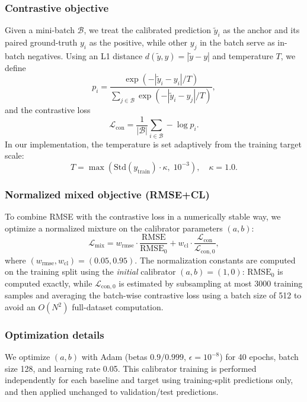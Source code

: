 \documentclass[11pt,conference,onecolumn]{IEEEtran}
\begin{document}
\subsubsection{Contrastive objective}
Given a mini-batch $\mathcal{B}$, we treat the calibrated prediction $\tilde{y}_i$ as the anchor and its paired ground-truth $y_i$ as the positive, while other $y_j$ in the batch serve as in-batch negatives. Using an L1 distance $d(\tilde{y},y)=|\tilde{y}-y|$ and temperature $T$, we define
\begin{equation}
p_i=
\frac{\exp\!\left(-|\tilde{y}_i-y_i|/T\right)}
{\sum_{j\in\mathcal{B}}\exp\!\left(-|\tilde{y}_i-y_j|/T\right)},
\end{equation}
and the contrastive loss
\begin{equation}
\mathcal{L}_{\mathrm{con}}=\frac{1}{|\mathcal{B}|}\sum_{i\in\mathcal{B}}-\log p_i.
\end{equation}
In our implementation, the temperature is set adaptively from the training target scale:
\begin{equation}
T=\max\!\left(\mathrm{Std}(y_{\mathrm{train}})\cdot \kappa,\;10^{-3}\right),\quad \kappa=1.0.
\end{equation}

\subsubsection{Normalized mixed objective (RMSE+CL)}
To combine RMSE with the contrastive loss in a numerically stable way, we optimize a normalized mixture on the calibrator parameters $(a,b)$:
\begin{equation}
\mathcal{L}_{\mathrm{mix}}
= w_{\mathrm{rmse}} \cdot \frac{\mathrm{RMSE}}{\mathrm{RMSE}_0}
+ w_{\mathrm{cl}}\cdot \frac{\mathcal{L}_{\mathrm{con}}}{\mathcal{L}_{\mathrm{con},0}},
\end{equation}
where $(w_{\mathrm{rmse}},w_{\mathrm{cl}})=(0.05,0.95)$. The normalization constants are computed on the training split using the \emph{initial} calibrator $(a,b)=(1,0)$: $\mathrm{RMSE}_0$ is computed exactly, while $\mathcal{L}_{\mathrm{con},0}$ is estimated by subsampling at most 3000 training samples and averaging the batch-wise contrastive loss using a batch size of 512 to avoid an $O(N^2)$ full-dataset computation.

\subsubsection{Optimization details}
We optimize $(a,b)$ with Adam (betas $0.9/0.999$, $\epsilon=10^{-8}$) for 40 epochs, batch size 128, and learning rate 0.05. This calibrator training is performed independently for each baseline and target using training-split predictions only, and then applied unchanged to validation/test predictions.
\end{document}
